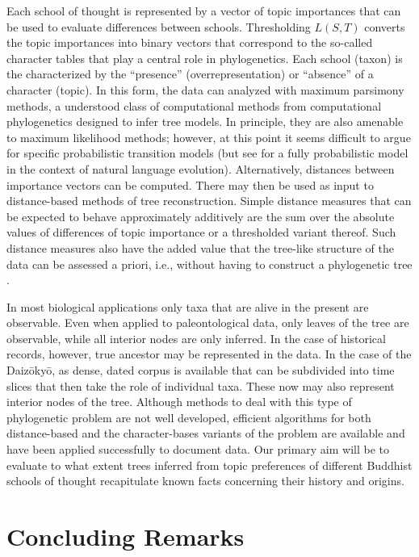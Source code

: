 \documentclass[a4paper,10pt]{article}
\newcommand{\PFS}[1]{\begingroup\color{blue}#1\endgroup}
\begin{document}
Each school of thought is represented by a vector of topic importances that
can be used to evaluate differences between schools. Thresholding $L(S,T)$
converts the topic importances into binary vectors that correspond to the
so-called character tables that play a central role in phylogenetics. Each
school (taxon) is the characterized by the ``presence''
(overrepresentation) or ``absence'' of a character (topic).  In this form,
the data can analyzed with maximum parsimony methods, a understood class of
computational methods from computational phylogenetics designed to infer
tree models. In principle, they are also amenable to maximum likelihood
methods; however, at this point it seems difficult to argue for specific
probabilistic transition models (but see \cite{Hruschka:15} for a fully
probabilistic model in the context of natural language
evolution). Alternatively, distances between importance vectors can be
computed. There may then be used as input to distance-based methods of tree
reconstruction. Simple distance measures that can be expected to behave
approximately additively are the sum over the absolute values of
differences of topic importance or a thresholded variant thereof. Such
distance measures also have the added value that the tree-like structure of
the data can be assessed a priori, i.e., without having to construct a
phylogenetic tree \cite{Misof:14}.

In most biological applications only taxa that are alive in the present are
observable. Even when applied to paleontological data, only leaves of the
tree are observable, while all interior nodes are only inferred. In the
case of historical records, however, true ancestor may be represented in
the data. In the case of the Daiz{\=o}ky{\=o}, as dense, dated corpus is
available that can be subdivided into time slices that then take the role
of individual taxa. These now may also represent interior nodes of the
tree. Although methods to deal with this type of phylogenetic problem are
not well developed, efficient algorithms for both distance-based and the
character-bases variants of the problem are available \cite{Telles:13} and
have been applied successfully to document data. \PFS{Our primary aim will
  be to evaluate to what extent trees inferred from topic preferences of
  different Buddhist schools of thought recapitulate known facts concerning
  their history and origins.}

\section{Concluding Remarks} 
\end{document}

